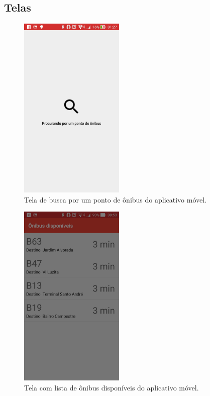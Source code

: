 \documentclass[
	12pt,				%
	oneside,			%
	a4paper,			%
	brazil				%
]{abntex2}
\begin{document}
\subsection{Telas}

\begin{figure}[h]
\centering
\includegraphics[width=5cm, center]{images/beacon_searching_bus_stop}
\caption{Tela de busca por um ponto de ônibus do aplicativo móvel.}
\label{Rotulo}
\end{figure}

\begin{figure}[h]
\centering
\includegraphics[width=5cm, center]{images/beacon_list_bus}
\caption{Tela com lista de ônibus disponíveis do aplicativo móvel.}
\label{Rotulo}
\end{figure}
\end{document}
